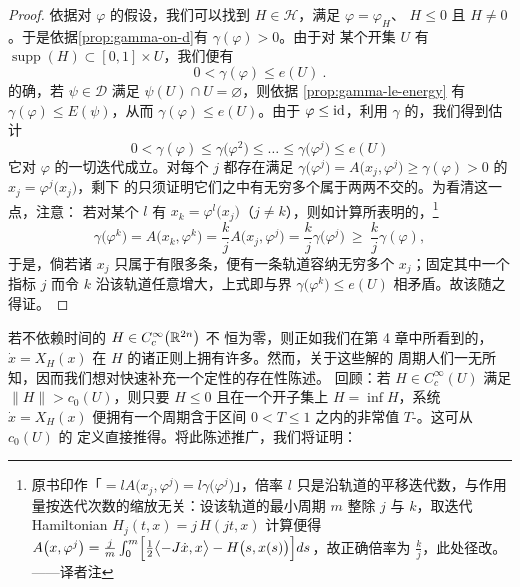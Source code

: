 \begin{proof}
依据对 $\varphi$ 的假设，我们可以找到 $H\in\mathcal{H}$，满足 $\varphi=\varphi_{H}$、%
$H\leq0$ 且 $H\neq0$。于是依据\cref{prop:gamma-on-d}有 $\gamma(\varphi)>0$。由于对%
某个\trBounded{}开集 $U$ 有 $\operatorname{supp}(H)\subset[0,1]\times U$，我们便有
\[
0<\gamma(\varphi)\leq e(U)\ .
\]
的确，若 $\psi\in\mathcal{D}$ 满足 $\psi(U)\cap U=\varnothing$，则依据%
\cref{prop:gamma-le-energy}%
有 $\gamma(\varphi)\leq E(\psi)$，从而 $\gamma(\varphi)\leq e(U)$。由于%
$\varphi\leq\mathrm{id}$，利用 $\gamma$ 的\trMonotonicity，我们得到估计
\[
0<\gamma(\varphi)\leq\gamma\bigl(\varphi^{2}\bigr)\leq\ldots\leq%
\gamma\bigl(\varphi^{j}\bigr)\leq e(U)
\]
它对 $\varphi$ 的一切迭代成立。对每个 $j$ 都存在满足 $\gamma\bigl(\varphi^{j}\bigr)=A\bigl(x_{j},\varphi^{j}\bigr)%
\geq\gamma(\varphi)>0$ 的\trFixedPoint{} $x_{j}=\varphi^{j}\bigl(x_{j}\bigr)$，剩下%
的只须证明它们之中有无穷多个属于两两不交的\trPeriodicOrbit。为看清这一点，注意：%
若对某个 $l$ 有 $x_{k}=\varphi^{l}\bigl(x_{j}\bigr)$（$j\neq k$），则如计算所表明的，\footnote{原书印作「$=lA\bigl(x_{j},\varphi^{j}\bigr)=l\gamma\bigl(\varphi^{j}\bigr)$」，倍率 $l$ 只是沿轨道的平移迭代数，与作用量按迭代次数的缩放无关：设该轨道的最小周期 $m$ 整除 $j$ 与 $k$，取迭代 Hamiltonian $H_{j}(t,x)=j\,H(jt,x)$ 计算便得 $A\bigl(x,\varphi^{j}\bigr)=\tfrac{j}{m}\int_{0}^{m}\Bigl[\tfrac{1}{2}\bigl\langle-J\dot{x},x\bigr\rangle-H\bigl(s,x(s)\bigr)\Bigr]ds$，故正确倍率为 $\tfrac{k}{j}$，此处径改。——译者注}
\[
\gamma\bigl(\varphi^{k}\bigr)=A\bigl(x_{k},\varphi^{k}\bigr)=\frac{k}{j}A\bigl(x_{j},\varphi^{j}\bigr)=%
\frac{k}{j}\gamma\bigl(\varphi^{j}\bigr)\ \geq\ \frac{k}{j}\gamma(\varphi),
\]
于是，倘若诸 $x_{j}$ 只属于有限多条\trPeriodicOrbit，便有一条轨道容纳无穷多个 $x_{j}$；固定其中一个指标 $j$ 而令 $k$ 沿该轨道任意增大，上式即与界 $\gamma\bigl(\varphi^{k}\bigr)\leq e(U)$ 相矛盾。故该\trhTheorem{}随之得证。
\end{proof}

若不依赖时间的\trHamiltonianFunction{} $H\in C^{\infty}_{c}\bigl(\mathbb{R}^{2n}\bigr)$ 不%
恒为零，则正如我们在第 4 章中所看到的，\trHamiltonianSystem{} $\dot{x}=X_{H}(x)$%
在 $H$ 的诸正则\trEnergySurface{}上拥有许多\trPeriodicSolution。然而，关于这些解的%
周期人们一无所知，因而我们想对快速\trPeriodicSolution{}补充一个定性的存在性陈述。%
回顾：若 $H\in C^{\infty}_{c}(U)$ 满足 $\lVert H\rVert>c_{0}(U)$，则只要 $H\leq0$%
且在一个开子集上 $H=\inf H$，系统 $\dot{x}=X_{H}(x)$ 便拥有一个周期含于区间%
$0<T\leq1$ 之内的非常值 $T$-\trPeriodicSolution。这可从\trCapacity{} $c_{0}(U)$ 的%
定义直接推得。将此陈述推广，我们将证明：


